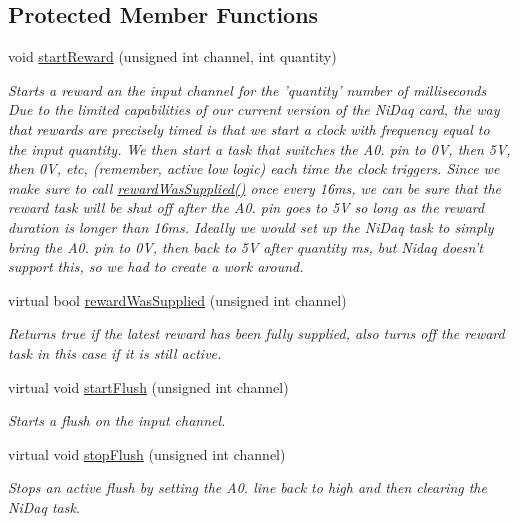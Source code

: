 \subsection*{Protected Member Functions}
\begin{DoxyCompactItemize}
\item 
void \hyperlink{class_picto_1_1_front_panel_reward_controller_a64ca898fc2a7295e7ab23d8ac0ce8af2}{start\-Reward} (unsigned int channel, int quantity)
\begin{DoxyCompactList}\small\item\em Starts a reward an the input channel for the 'quantity' number of milliseconds  Due to the limited capabilities of our current version of the Ni\-Daq card, the way that rewards are precisely timed is that we start a clock with frequency equal to the input quantity. We then start a task that switches the A0. pin to 0\-V, then 5\-V, then 0\-V, etc, (remember, active low logic) each time the clock triggers. Since we make sure to call \hyperlink{class_picto_1_1_front_panel_reward_controller_a7ffec247d11a69a9fc0f7494aa954311}{reward\-Was\-Supplied()} once every 16ms, we can be sure that the reward task will be shut off after the A0. pin goes to 5\-V so long as the reward duration is longer than 16ms. Ideally we would set up the Ni\-Daq task to simply bring the A0. pin to 0\-V, then back to 5\-V after quantity ms, but Nidaq doesn't support this, so we had to create a work around. \end{DoxyCompactList}\item 
virtual bool \hyperlink{class_picto_1_1_front_panel_reward_controller_a7ffec247d11a69a9fc0f7494aa954311}{reward\-Was\-Supplied} (unsigned int channel)
\begin{DoxyCompactList}\small\item\em Returns true if the latest reward has been fully supplied, also turns off the reward task in this case if it is still active. \end{DoxyCompactList}\item 
virtual void \hyperlink{class_picto_1_1_front_panel_reward_controller_aa98123b2113054a5606a634066757e2a}{start\-Flush} (unsigned int channel)
\begin{DoxyCompactList}\small\item\em Starts a flush on the input channel. \end{DoxyCompactList}\item 
virtual void \hyperlink{class_picto_1_1_front_panel_reward_controller_aa29df7541e45f4f01aaf2f8f7dd186c3}{stop\-Flush} (unsigned int channel)
\begin{DoxyCompactList}\small\item\em Stops an active flush by setting the A0. line back to high and then clearing the Ni\-Daq task. \end{DoxyCompactList}\end{DoxyCompactItemize}
